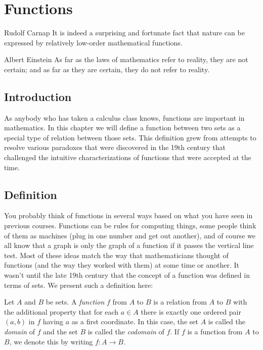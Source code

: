 \chapter{Functions}

\begin{chapqt}{Rudolf Carnap}
It is indeed a surprising and fortunate fact that nature can be expressed by relatively low-order mathematical functions.
\end{chapqt}

\begin{chapqt}{Albert Einstein}
As far as the laws of mathematics refer to reality, they are not certain; and as far as they are certain, they do not refer to reality.
\end{chapqt}

\section{Introduction}
As anybody who has taken a calculus class knows, functions are important in mathematics. In this chapter we will define a function between two sets as a special type of relation between those sets. This definition grew from attempts to resolve various paradoxes that were discovered in the 19th century that challenged the intuitive characterizations of functions that were accepted at the time.

\section{Definition}
You probably think of functions in several ways based on what you have seen in previous courses.  Functions can be rules for computing things, some people think of them as machines (plug in one number and get out another), and of course we all know that a graph is only the graph of a function if it passes the vertical line test.  Most of these ideas match the way that mathematicians thought of functions (and the way they worked with them) at some time or another.  It wasn't until the late 19th century that the concept of a function was defined in terms of sets.  We present such a definition here:

\begin{definition}
Let $A$ and $B$ be sets.  A \emph{function} $f$ from $A$ to $B$ is a relation from $A$ to $B$ with the additional property that for each $a\in A$ there is exactly one ordered pair $(a,b)$ in $f$ having $a$ as a first coordinate.  In this case, the set $A$ is called the \emph{domain} of $f$ and the set $B$ is called the \emph{codomain} of $f$. If $f$ is a function from $A$ to $B$, we denote this by writing $f:A\to B$.  
\end{definition}

